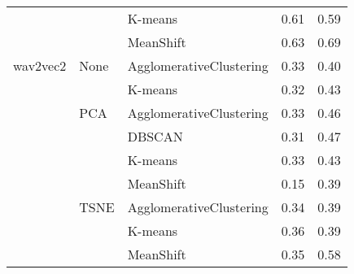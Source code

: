 \begin{tabular}{lllll}
         &      & K-means &  0.61 &      0.59 \\
         &      & MeanShift &  0.63 &      0.69 \\
\midrule
wav2vec2 & None & AgglomerativeClustering &  0.33 &      0.40 \\
         &      & K-means &  0.32 &      0.43 \\
         & PCA & AgglomerativeClustering &  0.33 &      0.46 \\
         &      & DBSCAN &  0.31 &      0.47 \\
         &      & K-means &  0.33 &      0.43 \\
         &      & MeanShift &  0.15 &      0.39 \\
         & TSNE & AgglomerativeClustering &  0.34 &      0.39 \\
         &      & K-means &  0.36 &      0.39 \\
         &      & MeanShift &  0.35 &      0.58 \\
\bottomrule
\end{tabular}
